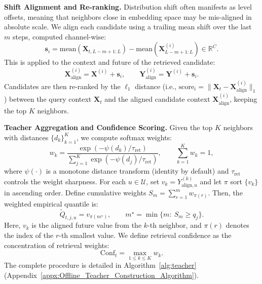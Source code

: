 \noindent\textbf{Shift Alignment and Re-ranking.}
Distribution shift often manifests as level offsets, meaning that  neighbors close in embedding space may be mis-aligned in absolute scale. We align each candidate using a trailing mean shift over the last $m$ steps, computed channel-wise:
\begin{equation}
\boldsymbol{s}_i=\mathrm{mean}\!\left(\mathbf{X}_{t,L-m+1:L}\right)-\mathrm{mean}\!\left(\mathbf{X}^{(i)}_{L-m+1:L}\right)\in\mathbb{R}^{C}.
\label{eq:tsm-shift}
\end{equation}
This is applied to the context and future of the retrieved candidate:
\begin{equation}
\mathbf{X}^{(i)}_{\text{align}}=\mathbf{X}^{(i)}+\boldsymbol{s}_i,\qquad
\mathbf{Y}^{(i)}_{\text{align}}=\mathbf{Y}^{(i)}+\boldsymbol{s}_i.
\label{eq:tsm-align}
\end{equation}
Candidates are then re-ranked by the $\ell_1$ distance (i.e., $\text{score}_i=\|\mathbf{X}_t-\mathbf{X}^{(i)}_{\text{align}}\|_1$) between the query context $\mathbf{X}_t$ and the aligned candidate context $\mathbf{X}^{(i)}_{\text{align}}$, keeping the top $K$ neighbors.

\noindent\textbf{Teacher Aggregation and Confidence Scoring.}
Given the top $K$ neighbors with distances $\{d_k\}_{k=1}^{K}$, we compute softmax weights:
\begin{equation}
w_k=\frac{\exp\!\left(-\psi(d_k)/\tau_{\text{ret}}\right)}
{\sum_{j=1}^{K}\exp\!\left(-\psi(d_j)/\tau_{\text{ret}}\right)},
\qquad \sum_{k=1}^K w_k=1,
\label{eq:tsm-ret-weights}
\end{equation}
where $\psi(\cdot)$ is a monotone distance transform (identity by default) and $\tau_{\text{ret}}$ controls the weight sharpness. For each $u\in\mathcal{U}$, set $v_k=Y^{(k)}_{\text{align},u}$ and let $\pi$ sort $\{v_k\}$ in ascending order. Define cumulative weights $S_m=\sum_{r=1}^{m} w_{\pi(r)}$. Then, the weighted empirical quantile is:
\begin{equation}
\widetilde{Q}_{t,j,u}=v_{\pi(m^\star)},\qquad
m^\star=\min\{m:~S_m\ge q_j\}.
\label{eq:tsm-teacher-quantile}
\end{equation}
Here, $v_k$ is the aligned future value from the $k$-th neighbor, and $\pi(r)$ denotes the index of the $r$-th smallest value. We define retrieval confidence as the concentration of retrieval weights:
\begin{equation}
\mathrm{Conf}_t=\max_{1\le k\le K} w_k.
\label{eq:tsm-conf}
\end{equation}
The complete procedure is detailed in Algorithm~\ref{alg:teacher} (Appendix~\ref{appx:Offline_Teacher_Construction_Algorithm}).

